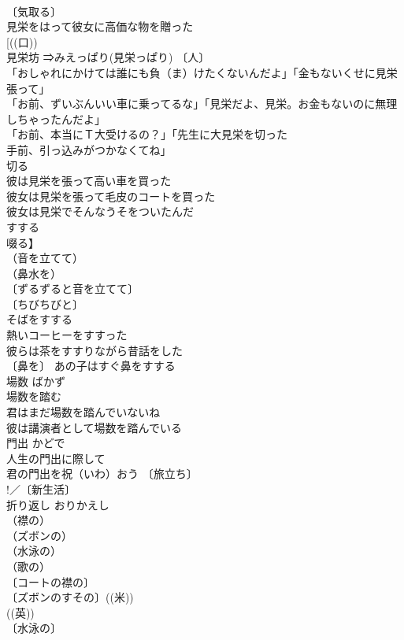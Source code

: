 \documentclass[8pt]{extreport}
\begin{document}
\begin{CJK}{UTF8}{min}
\\	〔気取る〕
\\	見栄をはって彼女に高価な物を贈った 
\\	[((口))
\\	見栄坊 ⇒みえっぱり(見栄っぱり) 〔人〕
\\	「おしゃれにかけては誰にも負（ま）けたくないんだよ」「金もないくせに見栄張って」 
\\	「お前、ずいぶんいい車に乗ってるな」「見栄だよ、見栄。お金もないのに無理しちゃったんだよ」 
\\	「お前、本当にＴ大受けるの？」「先生に大見栄を切った
\\	手前、引っ込みがつかなくてね」 
\\	切る　
\\	彼は見栄を張って高い車を買った 
\\	彼女は見栄を張って毛皮のコートを買った 
\\	彼女は見栄でそんなうそをついたんだ 
\\	すする	
\\	啜る】	
\\	（音を立てて）
\\	（鼻水を）
\\	〔ずるずると音を立てて〕
\\	〔ちびちびと〕
\\	そばをすする 
\\	熱いコーヒーをすすった 
\\	彼らは茶をすすりながら昔話をした 
\\	〔鼻を〕 あの子はすぐ鼻をすする 
\\	場数	ばかず	
\\	場数を踏む 
\\	君はまだ場数を踏んでいないね 
\\	彼は講演者として場数を踏んでいる 
\\	門出	かどで	
\\	人生の門出に際して 
\\	君の門出を祝（いわ）おう 〔旅立ち〕
\\	!／〔新生活〕
\\	折り返し	おりかえし	
\\	（襟の）
\\	（ズボンの）
\\	（水泳の）
\\	（歌の）
\\	〔コートの襟の〕
\\	〔ズボンのすその〕((米)) 
\\	((英)) 
\\	〔水泳の〕

\end{CJK}
\end{document}
